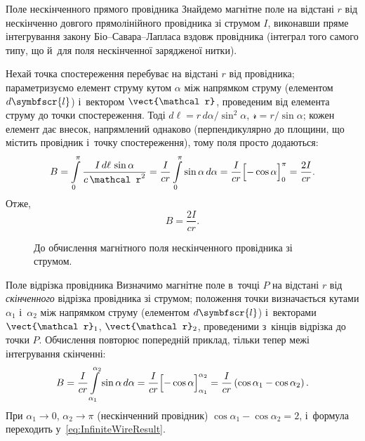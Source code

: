 \begin{Example}{Поле нескінченного прямого провідника}
	Знайдемо магнітне поле на відстані $r$ від нескінченно довгого прямолінійного провідника
	зі струмом $I$, виконавши пряме інтегрування закону Біо--Савара--Лапласа вздовж
	провідника (інтеграл того самого типу, що й~для поля нескінченної зарядженої нитки).

	Нехай точка спостереження перебуває на відстані $r$ від провідника; параметризуємо елемент
	струму кутом $\alpha$ між напрямком струму (елементом $d\symbfscr{l}$) і~вектором
	$\vect{\mathcal r}$, проведеним від елемента струму до точки спостереження. Тоді
	$d\ell = r\, d\alpha/\sin^2\alpha$, $\mathcal r = r/\sin\alpha$; кожен елемент дає
	внесок, напрямлений однаково (перпендикулярно до площини, що містить провідник і~точку
	спостереження), тому поля просто додаються:
	\begin{equation*}
		B = \int\limits_{0}^{\pi} \frac{I\, d\ell\, \sin\alpha}{c\,\mathcal r^2}
		= \frac{I}{cr}\int\limits_{0}^{\pi} \sin\alpha\, d\alpha
		= \frac{I}{cr}\Bigl[-\cos\alpha\Bigr]_{0}^{\pi}
		= \frac{2I}{cr}.
	\end{equation*}
	Отже,
	\begin{equation}\label{eq:InfiniteWireResult}
		B = \frac{2I}{cr}.
	\end{equation}

\end{Example}

\begin{figure}[h!]\centering
	\caption{До обчислення магнітного поля нескінченного провідника зі струмом.}
	\label{tikz:long-wire}
\end{figure}

\begin{Example}{Поле відрізка провідника}
	Визначимо магнітне поле в~точці $P$ на відстані $r$ від \emph{скінченного} відрізка
	провідника зі струмом; положення точки визначається кутами $\alpha_1$ і~$\alpha_2$ між
	напрямком струму (елементом $d\symbfscr{l}$) і~векторами $\vect{\mathcal r}_1$,
	$\vect{\mathcal r}_2$, проведеними з~кінців відрізка до точки $P$.
	Обчислення повторює попередній приклад, тільки тепер межі інтегрування скінченні:
	\begin{equation*}
		B = \frac{I}{cr}\int\limits_{\alpha_1}^{\alpha_2} \sin\alpha\, d\alpha
		= \frac{I}{cr}\Bigl[-\cos\alpha\Bigr]_{\alpha_1}^{\alpha_2}
		= \frac{I}{cr}\left(\cos\alpha_1 - \cos\alpha_2\right).
	\end{equation*}
	При $\alpha_1 \to 0$, $\alpha_2 \to \pi$ (нескінченний провідник) $\cos\alpha_1 - \cos\alpha_2 = 2$,
	і~формула переходить у~\eqref{eq:InfiniteWireResult}.
\end{Example}

